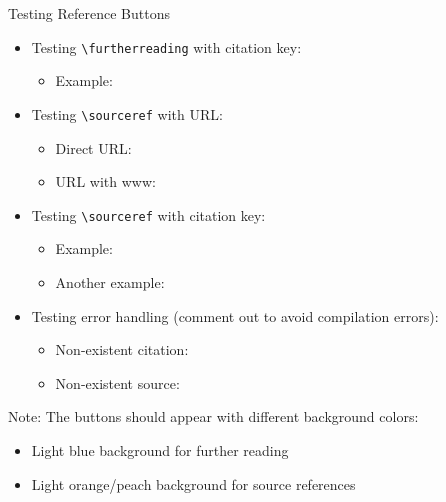 \documentclass[11pt,compress,t,notes=noshow, xcolor=table]{beamer}
\begin{document}
\begin{frame}{Testing Reference Buttons}

\begin{itemize}
\item Testing \texttt{\textbackslash furtherreading} with citation key:
  \begin{itemize}
  \item Example: 
  \end{itemize}

\item Testing \texttt{\textbackslash sourceref} with URL:
  \begin{itemize}
  \item Direct URL: 
  \item URL with www: 
  \end{itemize}

\item Testing \texttt{\textbackslash sourceref} with citation key:
  \begin{itemize}
  \item Example: 
  \item Another example: 
  \end{itemize}
  
\item Testing error handling (comment out to avoid compilation errors):
  \begin{itemize}
  \item Non-existent citation: %
  \item Non-existent source: %
  \end{itemize}

\end{itemize}

\vspace{1em}
Note: The buttons should appear with different background colors:
\begin{itemize}
\item Light blue background for further reading
\item Light orange/peach background for source references
\end{itemize}

\end{frame}
\end{document}
